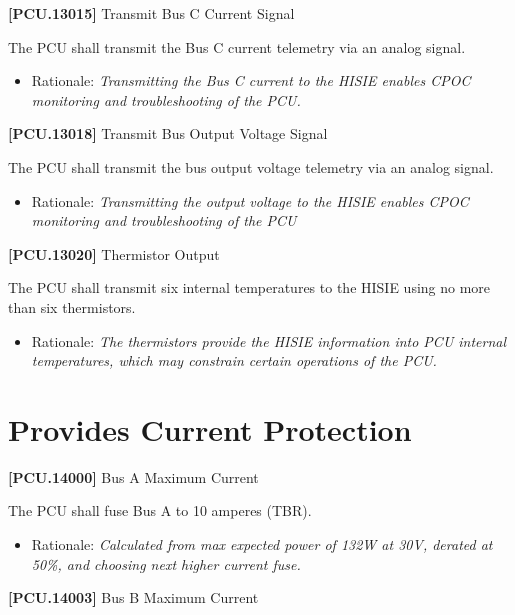 \documentclass[12pt,oneside,oldfontcommands]{memoir}
\begin{document}
\textbf{[PCU.13015]} Transmit Bus C Current Signal

The \gls{PCU} shall transmit the Bus C current telemetry via an analog signal.

\begin{itemize}
\item{} Rationale: \emph{Transmitting the Bus C current to the HISIE enables CPOC monitoring and troubleshooting of the PCU.}

\end{itemize}

\textbf{[PCU.13018]} Transmit Bus Output Voltage Signal

The \gls{PCU} shall transmit the bus output voltage telemetry via an analog signal.

\begin{itemize}
\item{} Rationale: \emph{Transmitting the output voltage to the HISIE enables CPOC monitoring and troubleshooting of the PCU}

\end{itemize}

\textbf{[PCU.13020]} Thermistor Output

The \gls{PCU} shall transmit six internal temperatures to the \gls{HISIE} using no more than six thermistors.

\begin{itemize}
\item{} Rationale: \emph{The thermistors provide the HISIE information into PCU internal temperatures, which may constrain certain operations of the PCU.}

\end{itemize}

\section{Provides Current Protection}
\label{providescurrentprotection}

\textbf{[PCU.14000]} Bus A Maximum Current

The \gls{PCU} shall fuse Bus A to 10 amperes (TBR\label{tbx_7}).

\begin{itemize}
\item{} Rationale: \emph{Calculated from max expected power of 132W at 30V, derated at 50\%, and choosing next higher current fuse.}

\end{itemize}

\textbf{[PCU.14003]} Bus B Maximum Current
\end{document}
